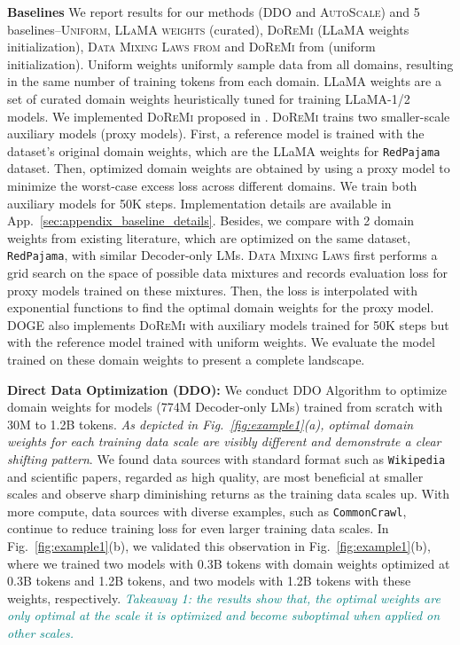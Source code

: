 \documentclass{article} %
\newcommand{\kang}[1]{\textbf{\textcolor{cyan}{[Feiyang: #1]}}}
\begin{document}
\textbf{Baselines}
We report results for our methods (\textsc{DDO} and \textsc{AutoScale}) and 5 baselines–\textsc{Uniform}, \textsc{LLaMA weights} (curated), \textsc{DoReMi} (LLaMA weights initialization), \textsc{Data Mixing Laws from \citep{ye2024data}} and \textsc{DoReMi} from \citep{xie2024doremi} (uniform initialization). Uniform weights uniformly sample data from all domains, resulting in the same number of training tokens from each domain. LLaMA weights are a set of curated domain weights heuristically tuned for training LLaMA-1/2 models. We implemented \textsc{DoReMi} proposed in \citep{xie2024doremi}. \textsc{DoReMi} trains two smaller-scale auxiliary models (proxy models). First, a reference model is trained with the dataset's original domain weights, which are the LLaMA weights for \texttt{RedPajama} dataset. Then, optimized domain weights are obtained by using a proxy model to minimize the worst-case excess loss across different domains. We train both auxiliary models for 50K steps. Implementation details are available in App.~\ref{sec:appendix_baseline_details}. Besides, we compare with 2 domain weights from existing literature, which are optimized on the same dataset, \texttt{RedPajama}, with similar Decoder-only LMs. \textsc{Data Mixing Laws} \citep{ye2024data} first performs a grid search on the space of possible data mixtures and records evaluation loss for proxy models trained on these mixtures. Then, the loss is interpolated with exponential functions to find the optimal domain weights for the proxy model. \textsc{DOGE} \citep{fan2023doge} also implements \textsc{DoReMi} \citep{xie2024doremi} with auxiliary models trained for 50K steps but with the reference model trained with uniform weights. We evaluate the model trained on these domain weights to present a complete landscape.



\textbf{Direct Data Optimization (\textsc{DDO}):}
We conduct \textsc{DDO} Algorithm to optimize domain weights for models (774M Decoder-only LMs) trained from scratch with 30M to 1.2B tokens.
\textit{As depicted in Fig.~\ref{fig:example1}(a), optimal domain weights for each training data scale are visibly different and demonstrate a clear shifting pattern}. We found data sources with standard format such as \texttt{Wikipedia} and scientific papers, regarded as high quality, are most beneficial at smaller scales and observe sharp diminishing returns as the training data scales up. With more compute, data sources with diverse examples, such as \texttt{CommonCrawl}, continue to reduce training loss for even larger training data scales. 
In Fig.~\ref{fig:example1}(b), we validated this observation in Fig.~\ref{fig:example1}(b), where we trained two models with 0.3B tokens with domain weights optimized at 0.3B tokens and 1.2B tokens, and two models with 1.2B tokens with these weights, respectively. \textit{\textcolor{teal}{Takeaway 1: the results show that, the optimal weights are only optimal at the scale it is optimized and become suboptimal when applied on other scales.}}
\end{document}
